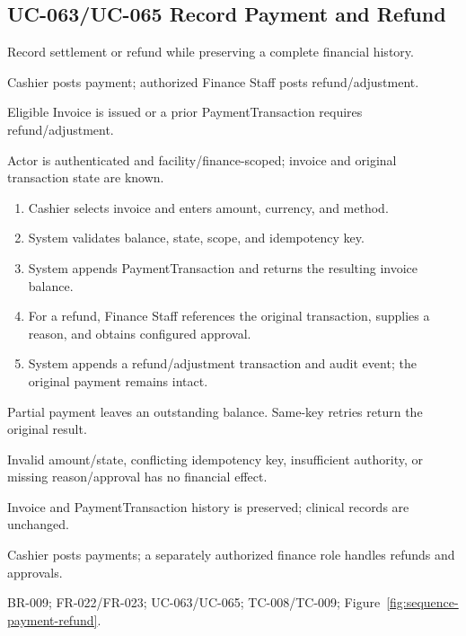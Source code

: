 \subsection{UC-063/UC-065 Record Payment and Refund}
\begin{description}[leftmargin=2.6cm,style=nextline]
\item[Goal] Record settlement or refund while preserving a complete financial history.
\item[Primary actors] Cashier posts payment; authorized Finance Staff posts refund/adjustment.
\item[Trigger] Eligible Invoice is issued or a prior PaymentTransaction requires refund/adjustment.
\item[Preconditions] Actor is authenticated and facility/finance-scoped; invoice and original transaction state are known.
\item[Main success flow]
\begin{enumerate}[leftmargin=1.4em]
  \item Cashier selects invoice and enters amount, currency, and method.
  \item System validates balance, state, scope, and idempotency key.
  \item System appends PaymentTransaction and returns the resulting invoice balance.
  \item For a refund, Finance Staff references the original transaction, supplies a reason, and obtains configured approval.
  \item System appends a refund/adjustment transaction and audit event; the original payment remains intact.
\end{enumerate}
\item[Alternative flows] Partial payment leaves an outstanding balance. Same-key retries return the original result.
\item[Exception flows] Invalid amount/state, conflicting idempotency key, insufficient authority, or missing reason/approval has no financial effect.
\item[Postconditions and data] Invoice and PaymentTransaction history is preserved; clinical records are unchanged.
\item[Authorization] Cashier posts payments; a separately authorized finance role handles refunds and approvals.
\item[Trace] BR-009; FR-022/FR-023; UC-063/UC-065; TC-008/TC-009; Figure~\ref{fig:sequence-payment-refund}.
\end{description}

